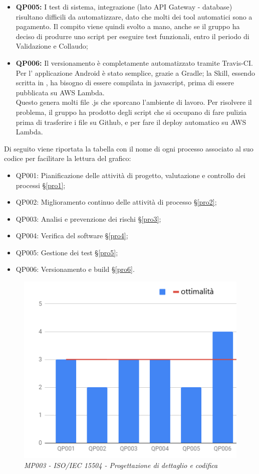\begin{itemize}
	\item \textbf{QP005:} I test di sistema, integrazione (lato API Gateway - database) risultano difficili da automatizzare, dato che molti dei tool automatici sono a pagamento. Il compito viene quindi svolto a mano, anche se il gruppo ha deciso di produrre uno script per eseguire test funzionali, entro il periodo di Validazione e Collaudo;
	\item \textbf{QP006:} Il versionamento è completamente automatizzato tramite Travis-CI. Per l' applicazione Android è stato semplice, grazie a Gradle; la Skill, essendo scritta in , ha bisogno di essere compilata in javascript, prima di essere pubblicata su AWS Lambda. \\Questo genera molti file .js che sporcano l'ambiente di lavoro. Per risolvere il problema, il gruppo ha prodotto degli script che si occupano di fare pulizia prima di trasferire i file su Github, e per fare il deploy automatico su AWS Lambda.
\end{itemize}
Di seguito viene riportata la tabella con il nome di ogni processo associato al suo codice per facilitare la lettura del grafico:
\begin{itemize}
	\item QP001: Pianificazione delle attività di progetto, valutazione e controllo dei processi \S\ref{pro1};
	\item QP002: Miglioramento continuo delle attività di processo \S\ref{pro2};
	\item QP003: Analisi e prevenzione dei rischi \S\ref{pro3};
	\item QP004: Verifica del software \S\ref{pro4};
	\item QP005: Gestione dei test \S\ref{pro5};
	\item QP006: Versionamento e build \S\ref{pro6}.
\end{itemize}
\begin{figure}[H]
    \centering
	\includegraphics[scale=0.7]{./images/spicePDC.png}
    \caption{\textit{MP003 - ISO/IEC 15504 - Progettazione di dettaglio e codifica}}
\end{figure}

